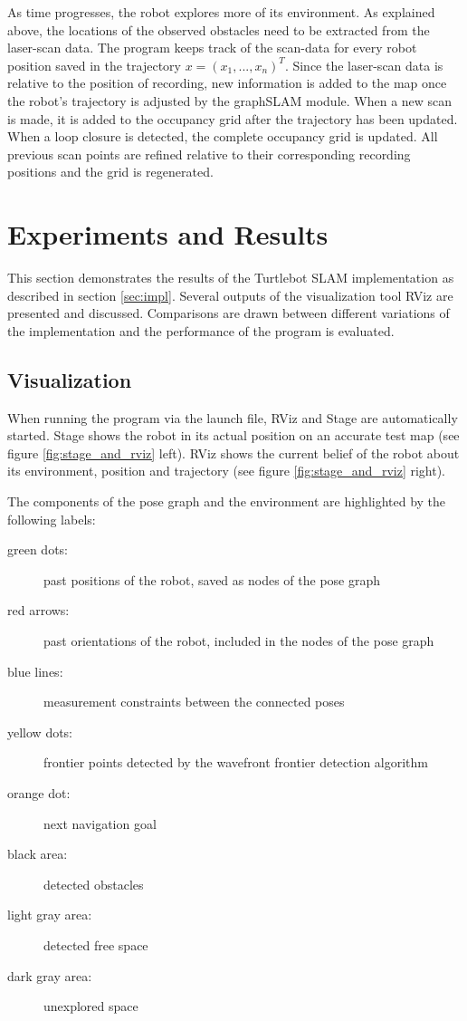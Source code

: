 \documentclass{ba-kecs}
\begin{document}
As time progresses, the robot explores more of its environment. As explained above, the locations of the observed obstacles need to be extracted from the laser-scan data. The program keeps track of the scan-data for every robot position saved in the trajectory \(x = (x_1, ..., x_n)^T \). Since the laser-scan data is relative to the position of recording, new information is added to the map once the robot's trajectory is adjusted by the graphSLAM module. When a new scan is made, it is added to the occupancy grid after the trajectory has been updated. When a loop closure is detected, the complete occupancy grid is updated. All previous scan points are refined relative to their corresponding recording positions and the grid is regenerated.

\section{Experiments and Results}
\label{sec:exp}
This section demonstrates the results of the Turtlebot SLAM implementation as described in section \ref{sec:impl}. Several outputs of the visualization tool RViz are presented and discussed. Comparisons are drawn between different variations of the implementation and the performance of the program is evaluated.

\subsection{Visualization}
When running the program via the launch file, RViz and Stage are automatically started. Stage shows the robot in its actual position on an accurate test map (see figure \ref{fig:stage_and_rviz} left). RViz shows the current belief of the robot about its environment, position and trajectory (see figure \ref{fig:stage_and_rviz} right).

The components of the pose graph and the environment are highlighted by the following labels:

\begin{description}
\item[green dots: ]past positions of the robot, saved as nodes of the pose graph
\item[red arrows: ]past orientations of the robot, included in the nodes of the pose graph
\item[blue lines: ]measurement constraints between the connected poses
\item[yellow dots: ]frontier points detected by the wavefront frontier detection algorithm
\item[orange dot: ] next navigation goal
\item[black area: ] detected obstacles
\item[light gray area: ] detected free space
\item[dark gray area: ] unexplored space
\end{description}
\end{document}
